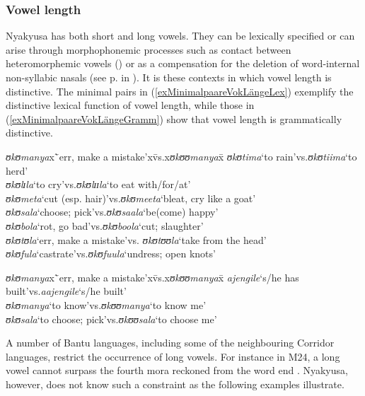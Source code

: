 \subsubsection{Vowel length}\label{VowelLength}  
Nyakyusa has both short and long vowels. They can be lexically specified or can arise through morphophonemic processes such as contact between heteromorphemic vowels () or as a compensation for the deletion of word-internal non-syllabic nasals (see p.\nobreakspace\pageref{NasalDelition} in ). It is these contexts in which vowel length is distinctive. The minimal pairs in (\ref{exMinimalpaareVokLängeLex}) exemplify the distinctive lexical function of vowel length, while those in (\ref{exMinimalpaareVokLängeGramm}) show that vowel length is grammatically distinctive.
\begin{exe}
	\ex \label{exMinimalpaareVokLängeLex}
	\begin{tabbing}
		\textit{ʊkʊmanya}x\=`err, make a mistake'x\=vs.x\=\textit{ʊkʊʊmanya}x\=\kill
		\textit{ʊkʊtima}\>`to rain'\>vs.\>\textit{ʊkʊtiima}\>`to herd'
		\\\textit{ʊkʊlɪla}\>`to cry'\>vs.\>\textit{ʊkʊlɪɪla}\>`to eat with/for/at'
		\\\textit{ʊkʊmeta}\>`cut (esp. hair)'\>vs.\>\textit{ʊkʊmeeta}\>`bleat, cry like a goat'
		\\\textit{ʊkʊsala}\>`choose; pick'\>vs.\>\textit{ʊkʊsaala}\>`be(come) happy'
		\\\textit{ʊkʊbola}\>`rot, go bad'\>vs.\>\textit{ʊkʊboola}\>`cut; slaughter'
		\\\textit{ʊkʊtʊla}\>`err, make a mistake'\>vs. \>\textit{ʊkʊtʊʊla}\>`take from the head'
		\\\textit{ʊkʊfula}\>`castrate'\>vs.\>\textit{ʊkʊfuula}\>`undress; open knots'		
	\end{tabbing}	
	\ex \label{exMinimalpaareVokLängeGramm}
	\begin{tabbing}
		\textit{ʊkʊmanya}x\=`err, make a mistake'x\=vs.x\=\textit{ʊkʊʊmanya}x\=\kill
		\textit{ajengile}\>`s/he has built'\>vs.\>\textit{aajengile}\>`s/he built'\\
		\textit{ʊkʊmanya}\>`to know'\>vs.\>\textit{ʊkʊʊmanya}\>`to know me' \\
		\textit{ʊkʊsala}\>`to choose; pick'\>vs.\>\textit{ʊkʊʊsala}\>`to choose me'
	\end{tabbing}	
\end{exe}
A number of Bantu languages, including some of the neighbouring Corridor languages, restrict the occurrence of long vowels. For instance in  M24, a long vowel cannot surpass the fourth mora reckoned from the word end \citep{KutschLojengaC2007}. Nyakyusa, however, does not know such a constraint as the following examples illustrate.
